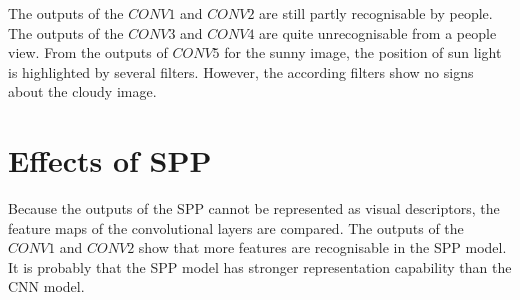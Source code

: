The outputs of the $CONV1$ and $CONV2$ are still partly recognisable by people. The outputs of the $CONV3$ and $CONV4$ are quite unrecognisable from a people view. From the outputs of $CONV5$ for the sunny image, the position of sun light is highlighted by several filters. However, the according filters show no signs about the cloudy image.

\section{Effects of SPP}

Because the outputs of the SPP cannot be represented as visual descriptors, the feature maps of the convolutional layers are compared. The outputs of the $CONV1$ and $CONV2$ show that more features are recognisable in the SPP model. It is probably that the SPP model has stronger representation capability than the CNN model.
 
